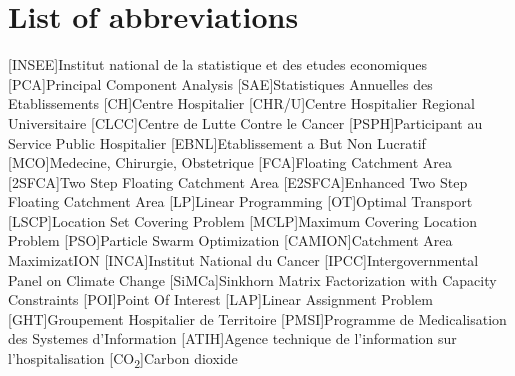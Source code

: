 \chapter*{List of abbreviations}



\begin{multicols}{2}

\begin{acronym}
        [INSEE]{Institut national de la statistique et des etudes economiques}
        [PCA]{Principal Component Analysis}
        [SAE]{Statistiques Annuelles des Etablissements}
        [CH]{Centre Hospitalier}
        [CHR/U]{Centre Hospitalier Regional \/ Universitaire}
        [CLCC]{Centre de Lutte Contre le Cancer}
        [PSPH]{Participant au Service Public Hospitalier }
        [EBNL]{Etablissement a But Non Lucratif}
        [MCO]{Medecine, Chirurgie, Obstetrique}
        [FCA]{Floating Catchment Area}
        [2SFCA]{Two Step Floating Catchment Area}
        [E2SFCA]{Enhanced Two Step Floating Catchment Area}
        [LP]{Linear Programming}
        [OT]{Optimal Transport}
        [LSCP]{Location Set Covering Problem}
        [MCLP]{Maximum Covering Location Problem}
        [PSO]{Particle Swarm Optimization}
        [CAMION]{Catchment Area MaximizatION}
        [INCA]{Institut National du Cancer}
        [IPCC]{Intergovernmental Panel on Climate Change}
        [SiMCa]{Sinkhorn Matrix Factorization with Capacity Constraints}
        [POI]{Point Of Interest}
        [LAP]{Linear Assignment Problem}
        [GHT]{Groupement Hospitalier de Territoire}
        [PMSI]{Programme de Medicalisation des Systemes d'Information}
        [ATIH]{Agence technique de l'information sur l'hospitalisation}
        [CO\textsubscript{2}]{Carbon dioxide}
\end{acronym}

\end{multicols}
